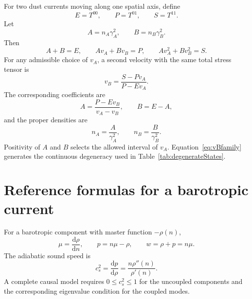 \documentclass[11pt]{article}
\newcommand{\dd}{\mathrm{d}}
\begin{document}
For two dust currents moving along one spatial axis, define
\begin{equation}
E=T^{00},
\qquad
P=T^{01},
\qquad
S=T^{11}.
\end{equation}
Let
\begin{equation}
A=n_A\gamma_A^2,
\qquad
B=n_B\gamma_B^2.
\end{equation}
Then
\begin{equation}
A+B=E,
\qquad
Av_A+Bv_B=P,
\qquad
Av_A^2+Bv_B^2=S.
\end{equation}
For any admissible choice of $v_A$, a second velocity with the same total stress tensor is
\begin{equation}
v_B=\frac{S-Pv_A}{P-Ev_A}.
\label{eq:vBfamily}
\end{equation}
The corresponding coefficients are
\begin{equation}
A=\frac{P-Ev_B}{v_A-v_B},
\qquad
B=E-A,
\end{equation}
and the proper densities are
\begin{equation}
n_A=\frac{A}{\gamma_A^2},
\qquad
n_B=\frac{B}{\gamma_B^2}.
\end{equation}
Positivity of $A$ and $B$ selects the allowed interval of $v_A$.  Equation~\eqref{eq:vBfamily} generates the continuous degeneracy used in Table~\ref{tab:degenerateStates}.

\section{Reference formulas for a barotropic current}

For a barotropic component with master function $-\rho(n)$,
\begin{equation}
\mu=\frac{\dd\rho}{\dd n},
\qquad
p=n\mu-\rho,
\qquad
w=\rho+p=n\mu.
\end{equation}
The adiabatic sound speed is
\begin{equation}
c_s^2=\frac{\dd p}{\dd\rho}
=\frac{n\rho''(n)}{\rho'(n)}.
\end{equation}
A complete causal model requires $0\leq c_s^2\leq1$ for the uncoupled components and the corresponding eigenvalue condition for the coupled modes.
\end{document}
